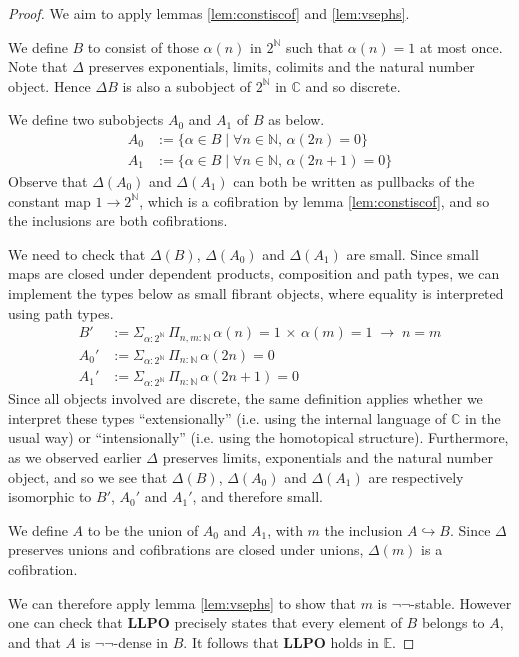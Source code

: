 \documentclass[a4paper]{amsart}
\theoremstyle{definition}
\newcommand{\cat}[1]{\mathbb{#1}}
\newcommand{\catc}{\cat{C}}
\newcommand{\nat}{\mathbb{N}}
\newcommand{\llpo}{\mathbf{LLPO}}
\begin{document}
\begin{proof}
  We aim to apply lemmas \ref{lem:constiscof} and \ref{lem:vsephs}.
  
  We define $B$ to consist of those $\alpha(n)$ in $2^\nat$ such that
  $\alpha(n) = 1$ at most once. Note that $\Delta$ preserves
  exponentials, limits, colimits and the natural number object. Hence
  $\Delta B$ is also a subobject of $2^\nat$ in $\catc$ and so
  discrete.

  We define two subobjects $A_0$ and $A_1$ of $B$ as below.
  \begin{align*}
    A_0 &:= \{ \alpha \in B \;|\; \forall n \in \nat,\, \alpha(2n) = 0 \}
           \\
    A_1 &:= \{ \alpha \in B \;|\; \forall n \in \nat,\, \alpha(2n + 1) = 0 \}
  \end{align*}
  Observe that $\Delta(A_0)$ and $\Delta(A_1)$ can both be written as
  pullbacks of the constant map $1 \to 2^\nat$, which is a cofibration
  by lemma \ref{lem:constiscof}, and so the inclusions
  are both cofibrations.

  We need to check that $\Delta(B)$, $\Delta(A_0)$ and $\Delta(A_1)$
  are small. Since small maps are closed under dependent products,
  composition and path types, we can implement the types below as
  small fibrant objects, where equality is interpreted using path
  types.
  \begin{align*}
    B' &:= \Sigma_{\alpha : 2^\nat} \, \Pi_{n, m : \nat}\,
         \alpha(n) = 1 \,\times\, \alpha(m) = 1 \;\to\;
         n = m \\
    A_0' &:= \Sigma_{\alpha : 2^\nat} \, \Pi_{n : \nat} \, \alpha(2n)
           = 0 \\
    A_1' &:= \Sigma_{\alpha : 2^\nat} \, \Pi_{n : \nat} \, \alpha(2n +
           1) = 0
  \end{align*}
  Since all objects involved are discrete, the same definition applies
  whether we interpret these types ``extensionally'' (i.e. using the
  internal language of $\catc$ in the usual way) or ``intensionally''
  (i.e. using the homotopical structure).  Furthermore, as we observed
  earlier $\Delta$ preserves limits, exponentials and the natural
  number object, and so we see that $\Delta(B)$, $\Delta(A_0)$ and
  $\Delta(A_1)$ are respectively isomorphic to $B'$, $A_0'$ and
  $A_1'$, and therefore small.
  
  We define $A$ to be the union of $A_0$ and $A_1$, with $m$ the
  inclusion $A \hookrightarrow B$. Since $\Delta$ preserves unions and
  cofibrations are closed under unions, $\Delta(m)$ is a
  cofibration.

  We can therefore apply lemma \ref{lem:vsephs} to show that $m$ is
  $\neg \neg$-stable. However one can check that $\llpo$ precisely
  states that every element of $B$ belongs to $A$, and that $A$ is
  $\neg \neg$-dense in $B$. It follows that $\llpo$ holds in
  $\cat{E}$.
\end{proof}
\end{document}
